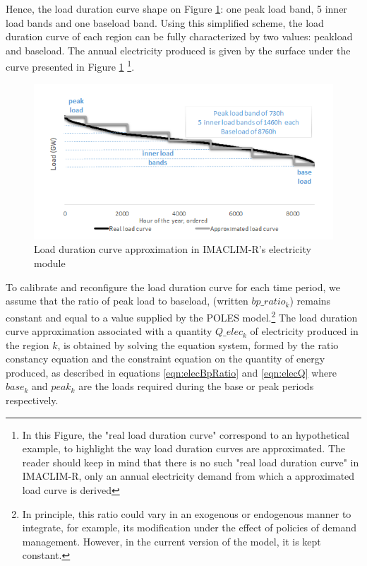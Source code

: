Hence, the load duration curve shape on Figure \ref{fig:LDC}: one peak load band, 5 inner load bands and one baseload band.
Using this simplified scheme, the load duration curve of each region can be fully characterized by two values: peakload and baseload. The annual electricity produced is given by the surface under the curve presented in Figure \ref{fig:LDC} \footnote{In this Figure, the "real load duration curve" correspond to an hypothetical example, to highlight the way load duration curves are approximated. The reader should keep in mind that there is no such "real load duration curve" in IMACLIM-R, only an annual electricity demand from which a approximated load curve is derived}. 

\begin{figure}
\includegraphics{figures&tables/LDC.png}
\caption{Load duration curve approximation in IMACLIM-R's electricity module}
\centering
\label{fig:LDC}
\end{figure}


To calibrate and reconfigure the load duration curve for each time period, we assume that the ratio of peak load to baseload, (written $bp\_ratio_k$) remains constant and equal to a value supplied by the POLES model.\footnote{
    In principle, this ratio could vary in an exogenous or endogenous manner to integrate, for example, its modification under the effect of policies of demand management. However, in the current version of the model, it is kept constant.
}
The load duration curve approximation associated with a quantity $Q\_elec_k$ of electricity produced in the region $k$, is obtained by solving the equation system, formed by the ratio constancy equation and the constraint equation on the quantity of energy produced, as described in equations \ref{eqn:elecBpRatio} and  \ref{eqn:elecQ}
where $base_k$ and $peak_k$ are the loads required during the base or peak periods respectively.

